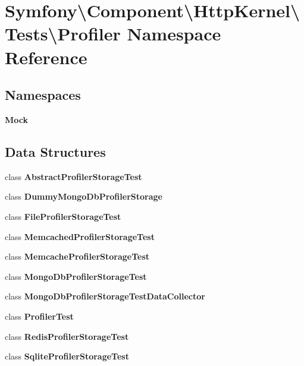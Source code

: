 \section{Symfony\textbackslash{}Component\textbackslash{}Http\+Kernel\textbackslash{}Tests\textbackslash{}Profiler Namespace Reference}
\label{namespace_symfony_1_1_component_1_1_http_kernel_1_1_tests_1_1_profiler}
\subsection*{Namespaces}
\begin{DoxyCompactItemize}
\item 
 {\bf Mock}
\end{DoxyCompactItemize}
\subsection*{Data Structures}
\begin{DoxyCompactItemize}
\item 
class {\bf Abstract\+Profiler\+Storage\+Test}
\item 
class {\bf Dummy\+Mongo\+Db\+Profiler\+Storage}
\item 
class {\bf File\+Profiler\+Storage\+Test}
\item 
class {\bf Memcached\+Profiler\+Storage\+Test}
\item 
class {\bf Memcache\+Profiler\+Storage\+Test}
\item 
class {\bf Mongo\+Db\+Profiler\+Storage\+Test}
\item 
class {\bf Mongo\+Db\+Profiler\+Storage\+Test\+Data\+Collector}
\item 
class {\bf Profiler\+Test}
\item 
class {\bf Redis\+Profiler\+Storage\+Test}
\item 
class {\bf Sqlite\+Profiler\+Storage\+Test}
\end{DoxyCompactItemize}
